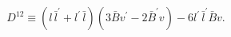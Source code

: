 \begin{equation*}
D^{12}\equiv (l\,\bar{l}^{\prime }+l^{\prime }\,\bar{l})(3\bar{B}v^{\prime
}-2\bar{B}^{\prime }v)-6l^{\prime }\,\bar{l}^{\prime }\bar{B}v.
\end{equation*}

